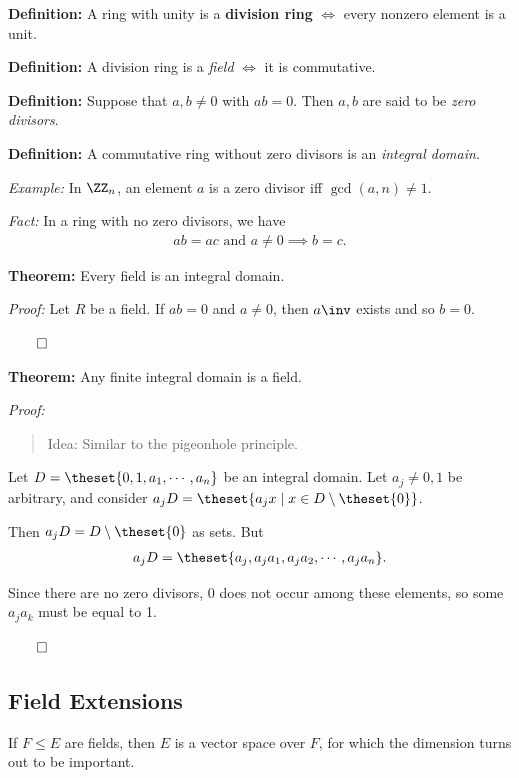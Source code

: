 \textbf{Definition:} A ring with unity is a \textbf{division ring}
\(\iff\) every nonzero element is a unit.

\textbf{Definition:} A division ring is a \emph{field} \(\iff\) it is
commutative.

\textbf{Definition:} Suppose that \(a,b \neq 0\) with \(ab = 0\). Then
\(a,b\) are said to be \emph{zero divisors}.

\textbf{Definition:} A commutative ring without zero divisors is an
\emph{integral domain}.

\emph{Example:} In \(\ZZ_n\), an element \(a\) is a zero divisor iff
\(\gcd(a, n) \neq 1\).

\emph{Fact:} In a ring with no zero divisors, we have
\begin{align*}
ab = ac \text{ and } a\neq 0 \implies b=c
.\end{align*}

\textbf{Theorem:} Every field is an integral domain.

\emph{Proof:} Let \(R\) be a field. If \(ab=0\) and \(a\neq 0\), then
\(a\inv\) exists and so \(b=0\).

\(\qed\)

\textbf{Theorem:} Any finite integral domain is a field.

\emph{Proof:}

\begin{quote}
Idea: Similar to the pigeonhole principle.
\end{quote}

Let \(D = \theset{0, 1, a_1, \cdots, a_n}\) be an integral domain. Let
\(a_j \neq 0, 1\) be arbitrary, and consider
\(a_j D = \theset{a_j x \mid x\in D\setminus\theset{0}}\).

Then \(a_j D = D\setminus\theset{0}\) as sets. But
\begin{align*}
a_j D = \theset{a_j, a_j a_1, a_j a_2, \cdots, a_j a_n}.
\end{align*}

Since there are no zero divisors, \(0\) does not occur among these
elements, so some \(a_j a_k\) must be equal to 1.

\(\qed\)

\hypertarget{field-extensions}{%
\subsection{Field Extensions}\label{field-extensions}}

If \(F \leq E\) are fields, then \(E\) is a vector space over \(F\), for
which the dimension turns out to be important.

